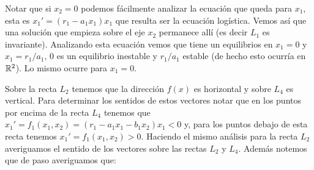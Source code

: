 Notar que si $x_2=0$ podemos fácilmente analizar la ecuación que
queda para $x_1$, esta es $x_1'=(r_1-a_1x_1)x_1$ que resulta ser
la ecuación logística. Vemos así que una solución que empieza
sobre el eje $x_2$ permanece allí (es decir $L_1$ es invariante).
Analizando esta ecuación vemos que tiene un equilibrios en $x_1=0$
y $x_1=r_1/a_1$, $0$ es un equilibrio inestable y $r_1/a_1$
estable (de hecho esto ocurría en $\mathbb{R}^2$). Lo mismo ocurre para
$x_1=0$.

Sobre la recta $L_2$ tenemos que la dirección $f(x)$ es horizontal
y sobre $L_4$ es vertical. Para determinar los sentidos de estos
vectores notar que en los puntos por encima de la recta $L_4$
tenemos que $x_1'=f_1(x_1,x_2)=(r_1-a_1x_1-b_1x_2)x_1<0$ y, para
los puntos debajo de esta recta tenemos $x_1'=f_1(x_1,x_2)>0$.
Haciendo el mismo análisis para la recta $L_2$ averiguamos el
sentido de los vectores sobre las rectas $L_2$ y $L_4$. Además
notemos que de paso averiguamos que:

